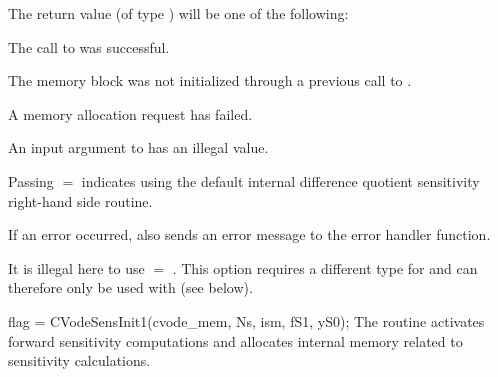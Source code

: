 {
  The return value  (of type ) will be one of the following:
  \begin{args}
  \item[\Id{CV\_SUCCESS}]
    The call to  was successful.
  \item[\Id{CV\_MEM\_NULL}] 
    The {\cvodes} memory block was not initialized through a 
    previous call to .
  \item[\Id{CV\_MEM\_FAIL}] 
    A memory allocation request has failed.
  \item[\Id{CV\_ILL\_INPUT}] 
    An input argument to  has an illegal value.
  \end{args}
}
{
  Passing $=$ indicates using the default internal difference 
  quotient sensitivity right-hand side routine.

  If an error occurred,  also sends an error message to the
  error handler function.

  {\warn}It is illegal here to use  $=$ . This option
  requires a different type for  and can therefore only be used with
   (see below).
}
{
  flag = CVodeSensInit1(cvode\_mem, Ns, ism, fS1, yS0);
}
{
  The routine  activates forward sensitivity computations and
  allocates internal memory related to sensitivity calculations.
}

